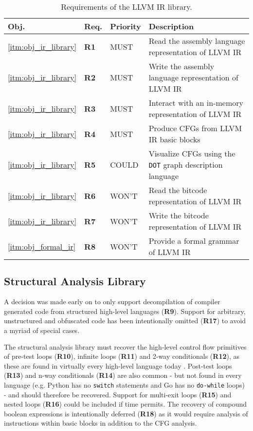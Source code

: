 \begin{table}[htbp]
	\begin{center}
		\begin{tabular}{|l|l|l|l|}
			\hline
			Obj. & Req. & Priority & Description \\
			\hline
			\ref{itm:obj_ir_library} & \textbf{R1} & MUST & Read the assembly language representation of LLVM IR \\
			\ref{itm:obj_ir_library} & \textbf{R2} & MUST & Write the assembly language representation of LLVM IR \\
			\ref{itm:obj_ir_library} & \textbf{R3} & MUST & Interact with an in-memory representation of LLVM IR \\
			\ref{itm:obj_ir_library} & \textbf{R4} & MUST & Produce CFGs from LLVM IR basic blocks \\
			\ref{itm:obj_ir_library} & \textbf{R5} & COULD & Visualize CFGs using the \texttt{DOT} graph description language \\
			\ref{itm:obj_ir_library} & \textbf{R6} & WON'T & Read the bitcode representation of LLVM IR \\
			\ref{itm:obj_ir_library} & \textbf{R7} & WON'T & Write the bitcode representation of LLVM IR \\
			\ref{itm:obj_formal_ir} & \textbf{R8} & WON'T & Provide a formal grammar of LLVM IR \\
			\hline
		\end{tabular}
	\end{center}
	\caption{Requirements of the LLVM IR library.}
\end{table}


\subsection{Structural Analysis Library}

A decision was made early on to only support decompilation of compiler generated code from structured high-level languages (\textbf{R9}). Support for arbitrary, unstructured and obfuscated code has been intentionally omitted (\textbf{R17}) to avoid a myriad of special cases.

The structural analysis library must recover the high-level control flow primitives of pre-test loops (\textbf{R10}), infinite loops (\textbf{R11}) and 2-way conditionals (\textbf{R12}), as these are found in virtually every high-level language today \cite{reverse_comp}. Post-test loops (\textbf{R13}) and n-way conditionals (\textbf{R14}) are also common - but not found in every language (e.g. Python has no \texttt{switch} statements and Go has no \texttt{do-while} loops) - and should therefore be recovered. Support for multi-exit loops (\textbf{R15}) and nested loops (\textbf{R16}) could be included if time permits. The recovery of compound boolean expressions is intentionally deferred (\textbf{R18}) as it would require analysis of instructions within basic blocks in addition to the CFG analysis.

